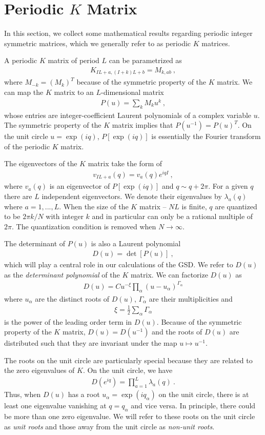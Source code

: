 \documentclass[aps,prb,twocolumn,superscriptaddress,floatfix,10pt,nofootinbib]{revtex4-2}
\newcommand{\ie}{\begin{equation}\begin{aligned}}
\newcommand{\fe}{\end{aligned}\end{equation}}
\theoremstyle{definition}
\begin{document}
\section{Periodic $K$ Matrix}\label{sec:poly}
In this section, we collect some mathematical results regarding periodic integer symmetric matrices, which we generally refer to as periodic $K$ matrices.

A periodic $K$ matrix of period $L$ can be parametrized as 
\ie\label{eq:Kmatrix}
K_{IL+a,(I+k)L+b}=M_{k,ab}~,
\fe
where $M_{-k}=(M_k)^T$ because of the symmetric property of the $K$ matrix. We can map the $K$ matrix to an $L$-dimensional matrix 
\ie\label{eq:P(u)}
P(u)=\sum_k M_ku^k~,
\fe
whose entries are integer-coefficient Laurent polynomials of a complex variable $u$. The symmetric property of the $K$ matrix implies that $P(u^{-1})=P(u)^T$. On the unit circle $u=\exp(iq)$, $P[\exp(iq)]$ is essentially the Fourier transform of the periodic $K$ matrix. 

The eigenvectors of the $K$ matrix take the form of
\ie\label{eq:eigenvec}
v_{IL+a}(q)=v_a(q)e^{iq I}~,
\fe
where $v_a(q)$ is an eigenvector of $P[\exp(iq)]$ and $q\sim q+2\pi$. For a given $q$ there are $L$ independent eigenvectors. We denote their eigenvalues by $\lambda_a(q)$ where $a=1,...,L$. When the size of the $K$ matrix -- $NL$ is finite, $q$ are quantized to be $2\pi k/N$ with integer $k$ and in particular can only be a rational multiple of $2\pi$. The quantization condition is removed when $N\to\infty$.

The determinant of $P(u)$ is also a Laurent polynomial
\ie\label{eq:Laurent_poly}
D(u)=\det[P(u)]~,
\fe 
which will play a central role in our calculations of the GSD. We refer to $D(u)$ as the \textit{determinant polynomial} of the $K$ matrix. We can factorize $D(u)$ as
\ie\label{eq:factorize}
D(u)=C u^{-\xi}\prod_{\alpha}(u-u_\alpha)^{\Gamma_\alpha}
\fe
where $u_\alpha$ are the distinct roots of $D(u)$, $\Gamma_\alpha$ are their multiplicities and
\ie\label{eq:def_degree}
\xi=\frac{1}{2}\sum_{\alpha}\Gamma_\alpha
\fe
is the power of the leading order term in $D(u)$. Because of the symmetric property of the $K$ matrix, $D(u)=D(u^{-1})$ and the roots of $D(u)$ are distributed such that they are invariant under the map $u\mapsto u^{-1}$.

The roots on the unit circle are particularly special because they are related to the zero eigenvalues of $K$. On the unit circle, we have
\ie\label{eq:eigenvalue_polynomial}
D(e^{iq})=\prod_{a=1}^L\lambda_a(q)~.
\fe
Thus, when $D(u)$ has a root $u_\alpha=\exp(iq_\alpha)$ on the unit circle, there is at least one eigenvalue vanishing at $q=q_\alpha$ and vice versa. In principle, there could be more than one zero eigenvalue. We will refer to these roots on the unit circle as \emph{unit roots} and those away from the unit circle as \emph{non-unit roots}.
\end{document}
